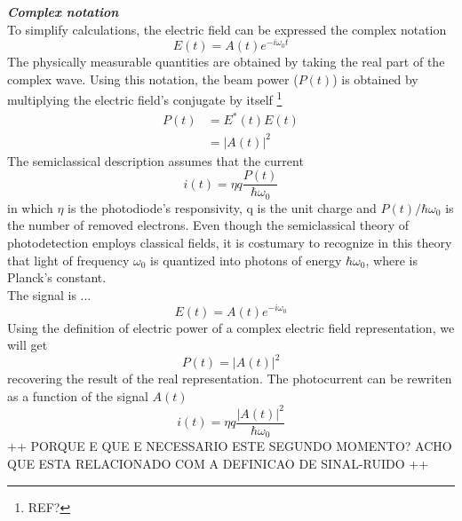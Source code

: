 \begin{bibunit}[plain]
\noindent
{\bf \em Complex notation}\\
To simplify calculations, the electric field can be expressed the complex notation
\cite{fox2006} %
%
\begin{equation}
	E(t) = A(t) e^{-i \omega_0 t}
\end{equation}
%
%
The physically measurable quantities are obtained by taking the real part of the complex wave. Using this notation, the beam power ($P(t)$) is obtained by multiplying the electric field's conjugate by itself
\footnote{REF?}
%
\begin{align}
	P(t) &= E^{*}(t) E(t)\nonumber\\
         &= |A(t)|^2
\end{align}
The semiclassical description assumes that the current 
%
\begin{equation}
	i(t) = \eta q \frac{P(t)}{\hbar \omega_0}
\end{equation}
in which $\eta$ is the photodiode's responsivity, q is the unit charge and $P(t)/\hbar \omega_0$ is the number of removed electrons. Even though the semiclassical theory of photodetection employs classical fields, it is costumary to recognize in this theory that light of frequency $\omega_0$ is quantized into photons of energy $\hbar \omega_0$, where is Planck's constant.
\cite{shapiro1985quantum} %
\\
The signal is ...
%
\begin{equation}
	E(t) = A(t) e^{-i \omega_0}
\end{equation}
%
Using the definition of electric power of a complex electric field representation, we will get
%
\begin{equation}
	P(t) = |A(t)|^2
	\label{eq:power}
\end{equation}
%
recovering the result of the real representation. The photocurrent can be rewriten as a function of the signal $A(t)$
%
\begin{equation}
	i(t) = \eta q \frac{|A(t)|^2}{\hbar \omega_0}
\end{equation}
%
++ PORQUE E QUE E NECESSARIO ESTE SEGUNDO MOMENTO? ACHO QUE ESTA RELACIONADO COM A DEFINICAO DE SINAL-RUIDO ++\\

\end{bibunit}
